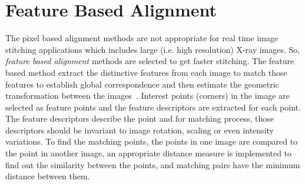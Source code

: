 \section{Feature Based Alignment}
The pixel based alignment methods are not appropriate for real time image stitching applications which includes large (i.e. high resolution) X-ray images. So, \emph{feature based alignment} methods are selected to get faster stitching. The feature based method extract the distinctive features from each image to match those features to establish global correspondence and then estimate the geometric transformation between the images~\cite{Szeliski:06}. Interest points (corners) in the image are selected as feature points and the feature descriptors are extracted for each point. The feature descriptors describe the point and for matching process, those descriptors should be invariant to image rotation, scaling or even intensity variations. To find the matching points, the points in one image are compared to the point in another image, an appropriate distance measure is implemented to find out the similarity between the points, and matching pairs have the minimum distance between them. 

